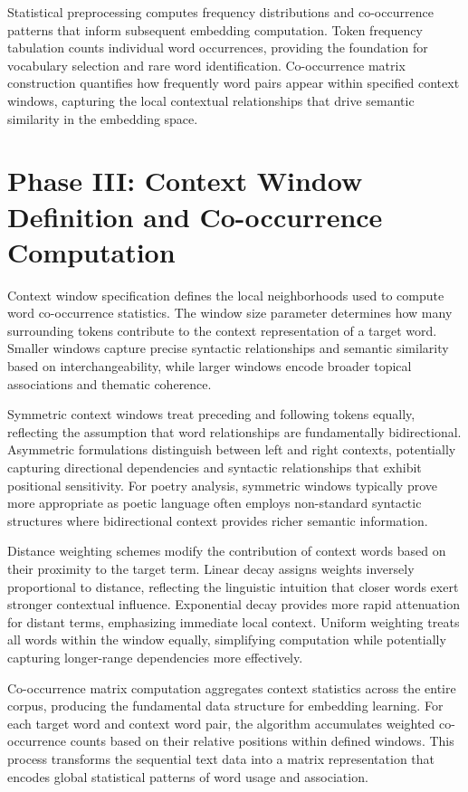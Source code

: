 \documentclass[11pt,a4paper]{article}
\begin{document}
Statistical preprocessing computes frequency distributions and co-occurrence patterns that inform subsequent embedding computation. Token frequency tabulation counts individual word occurrences, providing the foundation for vocabulary selection and rare word identification. Co-occurrence matrix construction quantifies how frequently word pairs appear within specified context windows, capturing the local contextual relationships that drive semantic similarity in the embedding space.

\section{Phase III: Context Window Definition and Co-occurrence Computation}

Context window specification defines the local neighborhoods used to compute word co-occurrence statistics. The window size parameter determines how many surrounding tokens contribute to the context representation of a target word. Smaller windows capture precise syntactic relationships and semantic similarity based on interchangeability, while larger windows encode broader topical associations and thematic coherence.

Symmetric context windows treat preceding and following tokens equally, reflecting the assumption that word relationships are fundamentally bidirectional. Asymmetric formulations distinguish between left and right contexts, potentially capturing directional dependencies and syntactic relationships that exhibit positional sensitivity. For poetry analysis, symmetric windows typically prove more appropriate as poetic language often employs non-standard syntactic structures where bidirectional context provides richer semantic information.

Distance weighting schemes modify the contribution of context words based on their proximity to the target term. Linear decay assigns weights inversely proportional to distance, reflecting the linguistic intuition that closer words exert stronger contextual influence. Exponential decay provides more rapid attenuation for distant terms, emphasizing immediate local context. Uniform weighting treats all words within the window equally, simplifying computation while potentially capturing longer-range dependencies more effectively.

Co-occurrence matrix computation aggregates context statistics across the entire corpus, producing the fundamental data structure for embedding learning. For each target word and context word pair, the algorithm accumulates weighted co-occurrence counts based on their relative positions within defined windows. This process transforms the sequential text data into a matrix representation that encodes global statistical patterns of word usage and association.
\end{document}

